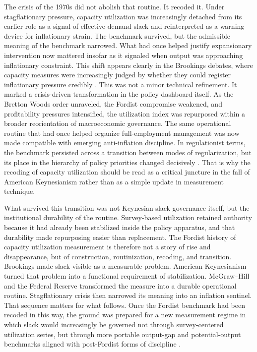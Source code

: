 \documentclass[11pt,a4paper]{article}
\begin{document}
The crisis of the 1970s did not abolish that routine. It recoded it. Under stagflationary pressure, capacity utilization was increasingly detached from its earlier role as a signal of effective-demand slack and reinterpreted as a warning device for inflationary strain. The benchmark survived, but the admissible meaning of the benchmark narrowed. What had once helped justify expansionary intervention now mattered insofar as it signaled when output was approaching inflationary constraint. This shift appears clearly in the Brookings debates, where capacity measures were increasingly judged by whether they could register inflationary pressure credibly \citep{KleinEtAl1973}. This was not a minor technical refinement. It marked a crisis-driven transformation in the policy dashboard itself. As the Bretton Woods order unraveled, the Fordist compromise weakened, and profitability pressures intensified, the utilization index was repurposed within a broader reorientation of macroeconomic governance. The same operational routine that had once helped organize full-employment management was now made compatible with emerging anti-inflation discipline. In regulationist terms, the benchmark persisted across a transition between modes of regularization, but its place in the hierarchy of policy priorities changed decisively \citep{Aglietta2000,Jessop2002}. That is why the recoding of capacity utilization should be read as a critical juncture in the fall of American Keynesianism rather than as a simple update in measurement technique.

What survived this transition was not Keynesian slack governance itself, but the institutional durability of the routine. Survey-based utilization retained authority because it had already been stabilized inside the policy apparatus, and that durability made repurposing easier than replacement. The Fordist history of capacity utilization measurement is therefore not a story of rise and disappearance, but of construction, routinization, recoding, and transition. Brookings made slack visible as a measurable problem. American Keynesianism turned that problem into a functional requirement of stabilization. McGraw--Hill and the Federal Reserve transformed the measure into a durable operational routine. Stagflationary crisis then narrowed its meaning into an inflation sentinel. That sequence matters for what follows. Once the Fordist benchmark had been recoded in this way, the ground was prepared for a new measurement regime in which slack would increasingly be governed not through survey-centered utilization series, but through more portable output-gap and potential-output benchmarks aligned with post-Fordist forms of discipline \citep{MahoneyThelen2009}.
\end{document}
